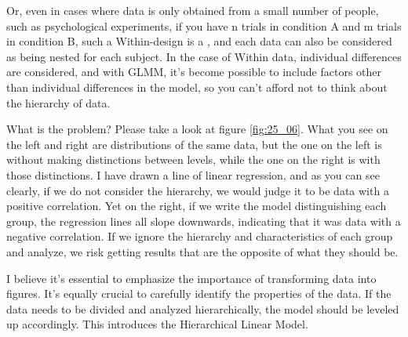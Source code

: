 \documentclass{ltjsbook}
\begin{document}
Or, even in cases where data is only obtained from a small number of people, such as psychological experiments, if you have n trials in condition A and m trials in condition B, such a Within-design is a , and each data can also be considered as being nested for each subject. In the case of Within data, individual differences are considered, and with GLMM, it's become possible to include factors other than individual differences in the model, so you can't afford not to think about the hierarchy of data.

What is the problem? Please take a look at figure \ref{fig:25_06}. What you see on the left and right are distributions of the same data, but the one on the left is without making distinctions between levels, while the one on the right is with those distinctions. I have drawn a line of linear regression, and as you can see clearly, if we do not consider the hierarchy, we would judge it to be data with a positive correlation. Yet on the right, if we write the model distinguishing each group, the regression lines all slope downwards, indicating that it was data with a negative correlation. If we ignore the hierarchy and characteristics of each group and analyze, we risk getting results that are the opposite of what they should be.


I believe it's essential to emphasize the importance of transforming data into figures. It's equally crucial to carefully identify the properties of the data. If the data needs to be divided and analyzed hierarchically, the model should be leveled up accordingly. This introduces the Hierarchical Linear Model.
\end{document}
